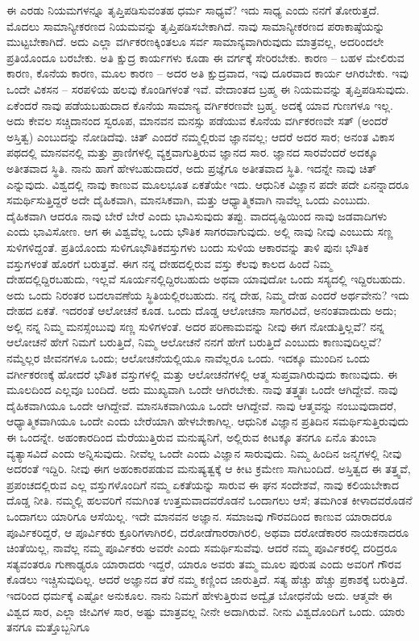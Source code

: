 ಈ ಎರಡು ನಿಯಮಗಳನ್ನೂ ತೃಪ್ತಿಪಡಿಸುವಂತಹ ಧರ್ಮ ಸಾಧ್ಯವೆ? ಇದು ಸಾಧ್ಯ ಎಂದು ನನಗೆ ತೋರುತ್ತದೆ. ಮೊದಲು ಸಾಮಾನ್ಯೀಕರಣದ ನಿಯಮವನ್ನು ತೃಪ್ತಿಪಡಿಸಬೇಕಾಗಿದೆ. ನಾವು ಸಾಮಾನ್ಯೀಕರಣದ ಪರಾಕಾಷ್ಠೆಯನ್ನು ಮುಟ್ಟಬೇಕಾಗಿದೆ. ಅದು ಎಲ್ಲಾ ವರ್ಗಿಕರಣಕ್ಕಿಂತಲೂ ಸರ್ವ ಸಾಮಾನ್ಯವಾಗಿರುವುದು ಮಾತ್ರವಲ್ಲ, ಅದರಿಂದಲೇ ಪ್ರತಿಯೊಂದೂ ಬರಬೇಕು. ಅತಿ ಕ್ಷುದ್ರ ಕಾರ್ಯಗಳು ಕೂಡಾ ಈ ವರ್ಗಕ್ಕೆ ಸೇರಿರಬೇಕು. ಕಾರಣ – ಬಹಳ ಮೇಲಿರುವ ಕಾರಣ, ಕೊನೆಯ ಕಾರಣ, ಮೂಲ ಕಾರಣ – ಅದರ ಅತಿ ಕ್ಷುದ್ರವಾದ, ಇವು ದೂರವಾದ ಕಾರ್ಯ ಆಗಿರಬೇಕು. ಇವು ಒಂದೇ ವಿಕಸನ – ಸರಪಳಿಯ ಹಲವು ಕೊಂಡಿಗಳಂತೆ ಇವೆ. ವೇದಾಂತದ ಬ್ರಹ್ಮ ಈ ನಿಯಮವನ್ನು ತೃಪ್ತಿಪಡಿಸುವುದು. ಏಕೆಂದರೆ ನಾವು ಪಡೆಯಬಹುದಾದ ಕೊನೆಯ ಸಾಮಾನ್ಯ ವರ್ಗಿಕರಣವೇ ಬ್ರಹ್ಮ. ಅದಕ್ಕೆ ಯಾವ ಗುಣಗಳೂ ಇಲ್ಲ. ಅದು ಕೇವಲ ಸಚ್ಚಿದಾನಂದ ಸ್ವರೂಪ, ಮಾನವನ ಮನಸ್ಸು ಪಡೆಯುವ ಕೊನೆಯ ವರ್ಗಿಕರಣವೇ ಸತ್ (ಅಂದರೆ ಅಸ್ತಿತ್ವ) ಎಂಬುದನ್ನು ನೋಡಿದೆವು. ಚಿತ್ ಎಂದರೆ ನಮ್ಮಲ್ಲಿರುವ ಜ್ಞಾನವಲ್ಲ; ಆದರೆ ಅದರ ಸಾರ; ಅನಂತ ವಿಕಾಸ ಪಥದಲ್ಲಿ ಮಾನವನಲ್ಲಿ ಮತ್ತು ಪ್ರಾಣಿಗಳಲ್ಲಿ ವ್ಯಕ್ತವಾಗುತ್ತಿರುವ ಜ್ಞಾನದ ಸಾರ. ಜ್ಞಾನದ ಸಾರವೆಂದರೆ ಅದಕ್ಕೂ ಅತೀತವಾದ ಸ್ಥಿತಿ. ನಾನು ಹಾಗೆ ಹೇಳಬಹುದಾದರೆ, ಅದು ಪ್ರಜ್ಞೆಗೂ ಅತೀತವಾದ ಸ್ಥಿತಿ. ಇದನ್ನೇ ನಾವು ಚಿತ್ ಎನ್ನುವುದು. ವಿಶ್ವದಲ್ಲಿ ನಾವು ಕಾಣುವ ಮೂಲಭೂತ ಏಕತೆಯೇ ಇದು. ಆಧುನಿಕ ವಿಜ್ಞಾನ ಪದೇ ಪದೇ ಏನನ್ನಾದರೂ ಸಮರ್ಥಿಸುತ್ತಿದ್ದರೆ ಅದೇ ದೈಹಿಕವಾಗಿ, ಮಾನಸಿಕವಾಗಿ, ಮತ್ತು ಆಧ್ಯಾತ್ಮಿಕವಾಗಿ ನಾವೆಲ್ಲ ಒಂದು ಎಂಬುದು. ದೈಹಿಕವಾಗಿ ಆದರೂ ನಾವು ಬೇರೆ ಬೇರೆ ಎಂದು ಭಾವಿಸುವುದು ತಪ್ಪು. ವಾದದೃಷ್ಟಿಯಿಂದ ನಾವು ಜಡವಾದಿಗಳು ಎಂದು ಭಾವಿಸೋಣ. ಆಗ ಈ ವಿಶ್ವವೆಲ್ಲ ಒಂದು ಭೌತಿಕ ಸಾಗರವಾಗುವುದು. ಅಲ್ಲಿ ನಾವು ನೀವು ಎಂಬುದು ಸಣ್ಣ ಸುಳಿಗಳಿದ್ದಂತೆ. ಪ್ರತಿಯೊಂದು ಸುಳಿಗೂ\break ಭೌತಿಕವಸ್ತುಗಳು ಬಂದು ಸುಳಿಯ ಆಕಾರವನ್ನು ತಾಳಿ ಪುನಃ ಭೌತಿಕ ವಸ್ತುಗಳಂತೆ ಹೊರಗೆ ಬರುತ್ತವೆ. ಈಗ ನನ್ನ ದೇಹದಲ್ಲಿರುವ ವಸ್ತು ಕೆಲವು ಕಾಲದ ಹಿಂದೆ ನಿಮ್ಮ ದೇಹದಲ್ಲಿದ್ದಿರಬಹುದು, ಇಲ್ಲವೆ ಸೂರ್ಯನಲ್ಲಿದ್ದಿರಬಹುದು ಅಥವಾ ಯಾವುದೋ ಒಂದು ಸಸ್ಯದಲ್ಲಿ ಇದ್ದಿರಬಹುದು. ಅದು ಒಂದು ನಿರಂತರ ಬದಲಾವಣೆಯ ಸ್ಥಿತಿಯಲ್ಲಿರಬಹುದು. ನನ್ನ ದೇಹ, ನಿಮ್ಮ ದೇಹ ಎಂದರೆ ಅರ್ಥವೇನು? ಇದು ದೇಹದ ಏಕತೆ. ಇದರಂತೆ ಆಲೋಚನೆ ಕೂಡ. ಒಂದು ದೊಡ್ಡ ಆಲೋಚನಾ ಸಾಗರವಿದೆ, ಅನಂತವಾದುದು ಅದು; ಅಲ್ಲಿ ನನ್ನ ನಿಮ್ಮ ಮನಸ್ಸೆಂಬುವು ಸಣ್ಣ ಸುಳಿಗಳಂತೆ. ಅದರ ಪರಿಣಾಮವನ್ನು ನೀವು ಈಗ ನೋಡುತ್ತಿಲ್ಲವೆ? ನನ್ನ ಆಲೋಚನೆ ಹೇಗೆ ನಿಮಗೆ ಬರುತ್ತಿದೆ, ನಿಮ್ಮ ಆಲೋಚನೆ ನನಗೆ ಹೇಗೆ ಬರುತ್ತಿದೆ ಎಂಬುದು ಕಾಣುವುದಿಲ್ಲವೆ? ನಮ್ಮೆಲ್ಲರ ಜೀವನಗಳೂ ಒಂದು; ಆಲೋಚನೆಯಲ್ಲಿಯೂ ನಾವೆಲ್ಲರೂ ಒಂದು. ಇದಕ್ಕೂ ಮುಂದಿನ ಒಂದು ವರ್ಗೀಕರಣಕ್ಕೆ ಹೋದರೆ ಭೌತಿಕ ವಸ್ತುಗಳಲ್ಲಿ ಮತ್ತು ಆಲೋಚನೆಗಳಲ್ಲಿ ಆತ್ಮ ಸುಪ್ತವಾಗಿರುವುದು ಕಾಣುವುದು. ಈ ಮೂಲದಿಂದ ಎಲ್ಲವೂ ಬಂದಿದೆ. ಅದು ಮುಖ್ಯವಾಗಿ ಒಂದೇ ಆಗಿರಬೇಕು. ನಾವು ತತ್ತ್ವತಃ ಒಂದೇ ಆಗಿದ್ದೇವೆ. ನಾವು ದೈಹಿಕವಾಗಿಯೂ ಒಂದೇ ಆಗಿದ್ದೇವೆ. ಮಾನಸಿಕವಾಗಿಯೂ ಒಂದೇ ಆಗಿದ್ದೇವೆ. ನಾವು ಆತ್ಮವನ್ನು ನಂಬುವುದಾದರೆ, ಆಧ್ಯಾತ್ಮಿಕವಾಗಿಯೂ ಒಂದೇ ಎಂದು ಬೇರೆಯಾಗಿ ಹೇಳಬೇಕಾಗಿಲ್ಲ. ಆಧುನಿಕ ವಿಜ್ಞಾನ ಪ್ರತಿದಿನ ಸಮರ್ಥಿಸುತ್ತಿರುವುದು ಈ ಒಂದನ್ನೇ. ಅಹಂಕಾರದಿಂದ ಮೆರೆಯುತ್ತಿರುವ ಮನುಷ್ಯನಿಗೆ, ಅಲ್ಲಿರುವ ಕೀಟಕ್ಕೂ ತನಗೂ ಏನೊ ತುಂಬಾ ವ್ಯತ್ಯಾಸವಿದೆ ಎಂದು ಅನ್ನಿಸುವುದು. ನೀವೆಲ್ಲ ಒಂದೇ ಎಂದು ವಿಜ್ಞಾನ ಸಾರುವುದು. ನಿಮ್ಮ ಹಿಂದಿನ ಜನ್ಮಗಳಲ್ಲಿ ನೀವು ಅದರಂತೆ ಇದ್ದಿರಿ. ನೀವು ಈಗ ಅಹಂಕಾರಪಡುವ ಮನುಷ್ಯತ್ವಕ್ಕೆ ಆ ಕೀಟ ಕ್ರಮೇಣ ಸಾಗಿಬಂದಿದೆ. ಅಸ್ತಿತ್ವದ ಈ ತತ್ತ್ವವೆ, ಪ್ರಪಂಚದಲ್ಲಿರುವ ಎಲ್ಲ ವಸ್ತುಗಳೊಂದಿಗೆ ನಮ್ಮ ಏಕತೆಯನ್ನು ಸಾರುವ ಈ ಘನ ಸಂದೇಶವೆ, ನಾವು ಕಲಿಯಬೇಕಾದ ದೊಡ್ಡ ನೀತಿ. ನಮ್ಮಲ್ಲಿ ಹಲವರಿಗೆ ನಮಗಿಂತ ಉತ್ತಮವಾದವರೊಡನೆ ಒಂದಾಗಲು ಆಸೆ; ತಮಗಿಂತ ಕೀಳಾದವರೊಡನೆ ಒಂದಾಗಲು ಯಾರಿಗೂ ಆಸೆಯಿಲ್ಲ. ಇದೇ ಮಾನವನ ಅಜ್ಞಾನ. ಸಮಾಜವು ಗೌರವದಿಂದ ಕಾಣುವ ಯಾರಾದರೂ ಪೂರ್ವಿಕರಿದ್ದರೆ, ಆ ಪೂರ್ವಿಕರು ಕ್ರೂರಿಗಳಾಗಿರಲಿ, ದರೋಡೆಗಾರರಾಗಿರಲಿ, ಅಥವಾ ದರೋಡೆಕಾರರ ನಾಯಕನಾದರೂ ಚಿಂತೆಯಿಲ್ಲ, ನಾವೆಲ್ಲ ನಮ್ಮ ಪೂರ್ವಿಕರು ಅವರೇ ಎಂದು ಸಮರ್ಥಿಸುವೆವು. ಆದರೆ ನಮ್ಮ ಪೂರ್ವಿಕರಲ್ಲಿ ದರಿದ್ರರೂ ಸತ್ಯವಂತರೂ ಗುಣಾಢ್ಯರೂ ಯಾರಾದರು ಇದ್ದರೆ, ಯಾರೂ ಅವರು ತಮ್ಮ ಮೂಲ ಪುರುಷ ಎಂದು ಅವರಿಗೆ ಗೌರವ ಕೊಡಲು ಇಚ್ಚಿಸುವುದಿಲ್ಲ. ಆದರೆ ಅಜ್ಞಾನದ ತೆರೆ ನಮ್ಮ ಕಣ್ಣಿಂದ ಜಾರುತ್ತಿದೆ. ಸತ್ಯ ಹೆಚ್ಚು ಹೆಚ್ಚು ಪ್ರಕಾಶಕ್ಕೆ ಬರುತ್ತಿದೆ. ಇದರಿಂದ ಧರ್ಮಕ್ಕೆ ಎಷ್ಟೋ ಅನುಕೂಲ. ನಾನು ನಿಮಗೆ ಹೇಳುತ್ತಿರುವ ಅದ್ವೈತ ಬೋಧನೆಯೆ ಅದು. ಆತ್ಮವೇ ಈ ವಿಶ್ವದ ಸಾರ, ಎಲ್ಲಾ ಜೀವಿಗಳ ಸಾರ, ಅಷ್ಟು ಮಾತ್ರವಲ್ಲ ನೀನೇ ಅದಾಗಿರುವೆ. ನೀನು ವಿಶ್ವದೊಂದಿಗೆ ಒಂದು. ಯಾರು ತನಗೂ ಮತ್ತೊಬ್ಬನಿಗೂ 